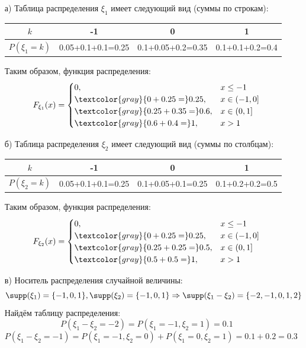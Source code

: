 \begin{enumerate}
	\item[а)]
	Таблица распределения $\xi_1$ имеет следующий вид (суммы по строкам):
	\begin{table}[H]
		\centering
		\begin{tabular}{|c|c|c|c|}
			\hline
			$k$            & -1                & 0                 & 1               \\ \hline
			$P(\xi_1 = k)$ & 0.05+0.1+0.1=0.25 & 0.1+0.05+0.2=0.35 & 0.1+0.1+0.2=0.4 \\ \hline
		\end{tabular}
	\end{table}
	Таким образом, функция распределения:
	\[
	F_{\xi_1}(x) =
	\begin{cases}
		0, &x \le -1 \\
		\textcolor{gray}{0+0.25=}0.25, &x \in (-1, 0] \\
		\textcolor{gray}{0.25+0.35=}0.6, &x \in (0, 1] \\
		\textcolor{gray}{0.6+0.4=}1, &x > 1
	\end{cases}
	\]
	\item[б)]
	Таблица распределения $\xi_2$ имеет следующий вид (суммы по столбцам):
	\begin{table}[H]
		\centering
		\begin{tabular}{|c|c|c|c|}
			\hline
			$k$            & -1                & 0                 & 1               \\ \hline
			$P(\xi_2 = k)$ & 0.05+0.1+0.1=0.25 & 0.1+0.05+0.1=0.25 & 0.1+0.2+0.2=0.5 \\ \hline
		\end{tabular}
	\end{table}
	Таким образом, функция распределения:
	\[
	F_{\xi_2}(x) =
	\begin{cases}
		0, &x \le -1 \\
		\textcolor{gray}{0+0.25=}0.25, &x \in (-1, 0] \\
		\textcolor{gray}{0.25+0.25=}0.5, &x \in (0, 1] \\
		\textcolor{gray}{0.5+0.5=}1, &x > 1
	\end{cases}
	\]
	\item[в)]
	Носитель распределения случайной величины:
	\[ \supp (\xi_1) = \{ -1, 0, 1 \}, \supp (\xi_2) = \{ -1, 0, 1 \} \Rightarrow \supp(\xi_1 - \xi_2) = \{ -2, -1, 0, 1, 2 \} \]
	Найдём таблицу распределения:
	\[ P(\xi_1 - \xi_2 = -2) = P(\xi_1 = -1, \xi_2 = 1) = 0.1 \]
	\[ P(\xi_1 - \xi_2 = -1) = P(\xi_1 = -1, \xi_2 = 0) + P(\xi_1 = 0, \xi_2 = 1) = 0.1 + 0.2 = 0.3 \]

\end{enumerate}
